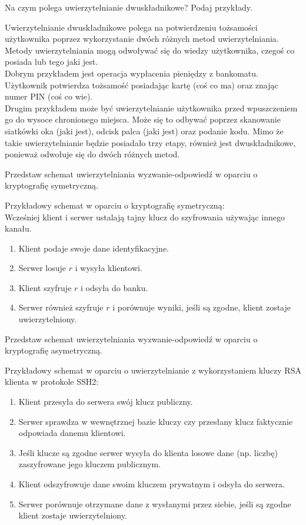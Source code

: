 \documentclass[answers,11pt]{exam}
\begin{document}
\begin{questions}
\question Na czym polega uwierzytelnianie dwuskładnikowe? Podaj przykłady.
\begin{solution}
Uwierzytelnianie dwuskładnikowe polega na potwierdzeniu tożsamości użytkownika poprzez wykorzystanie dwóch różnych metod uwierzytelniania. Metody uwierzytelniania mogą odwoływać się do wiedzy użytkownika, czegoś co posiada lub tego jaki jest.\\
Dobrym przykładem jest operacja wypłacenia pieniędzy z bankomatu. Użytkownik potwierdza tożsamość posiadając kartę (coś co ma) oraz znając numer PIN (coś co wie).\\
Drugim przykładem może być uwierzytelnianie użytkownika przed wpuszczeniem go do wysoce chronionego miejsca. Może się to odbywać poprzez skanowanie siatkówki oka (jaki jest), odcisk palca (jaki jest) oraz podanie kodu. Mimo że takie uwierzytelnianie będzie posiadało trzy etapy, również jest dwuskładnikowe, ponieważ odwołuje się do dwóch różnych metod.
\end{solution}

\question Przedstaw schemat uwierzytelniania wyzwanie-odpowiedź w oparciu o kryptografię symetryczną.
\begin{solution}
Przykładowy schemat w oparciu o kryptografię symetryczną:\\
Wcześniej klient i serwer ustalają tajny klucz do szyfrowania używając innego kanału.
\begin{enumerate}
\item Klient podaje swoje dane identyfikacyjne.
\item Serwer losuje $r$ i wysyła klientowi.
\item Klient szyfruje $r$ i odsyła do banku.
\item Serwer również szyfruje $r$ i porównuje wyniki, jeśli są zgodne, klient zostaje uwierzytelniony.
\end{enumerate}
\end{solution}

\question Przedstaw schemat uwierzytelniania wyzwanie-odpowiedź w oparciu o kryptografię asymetryczną.

\begin{solution}
Przykładowy schemat w oparciu o uwierzytelnianie z wykorzystaniem kluczy RSA klienta w protokole SSH2:
\begin{enumerate}
\item Klient przesyła do serwera swój klucz publiczny.
\item Serwer sprawdza w wewnętrznej bazie kluczy czy przesłany klucz faktycznie odpowiada danemu klientowi.
\item Jeśli klucze są zgodne serwer wysyła do klienta losowe dane (np. liczbę) zaszyfrowane jego kluczem publicznym.
\item Klient odszyfrowuje dane swoim kluczem prywatnym i odsyła do serwera.
\item Serwer porównuje otrzymane dane z wysłanymi przez siebie, jeśli są zgodne klient zostaje uwierzytelniony.
\end{enumerate}
\end{solution}


\end{questions}
\end{document}
